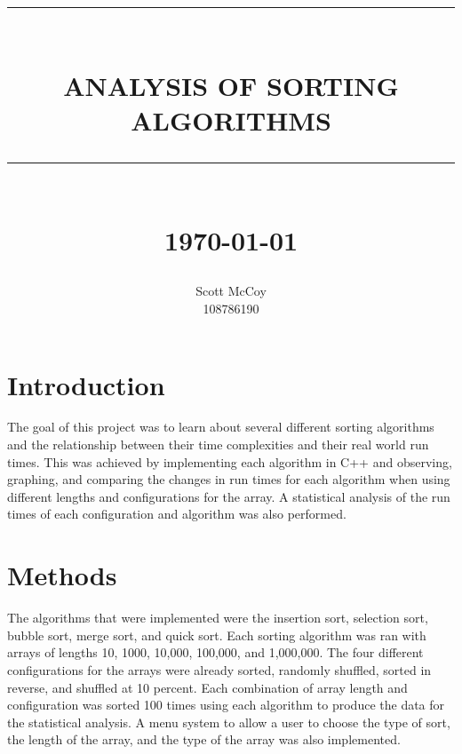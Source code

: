 \documentclass[12pt]{report}
\newcommand{\HRule}[1]{\rule{\linewidth}{#1}}
\begin{document}
\title{ \normalsize \textsc{}
        \\ [2.0cm]
        \HRule{0.5pt} \\
        \LARGE \textbf{\uppercase{Analysis of Sorting Algorithms}}
        \HRule{2pt} \\ [0.5cm]
        \normalsize \today \vspace*{5\baselineskip}}

\date{}

\author{
        Scott McCoy \\ 
        108786190 \\
       	}

\maketitle
\tableofcontents
\newpage

\sectionfont{\scshape}


\section*{Introduction}
	The goal of this project was to learn about several different
	sorting algorithms and the relationship between their time 
	complexities and their real world run times. This was achieved
	by implementing each algorithm in C++ and observing, graphing, 
	and comparing the changes in run times for each algorithm when 
	using different lengths and configurations for the array. A
	statistical analysis of the run times of each configuration
	and algorithm was also performed.

\section*{Methods}
	The algorithms that were implemented were the insertion sort,
	selection sort, bubble sort, merge sort, and quick sort. Each 
	sorting algorithm was ran with arrays of lengths 10, 1000, 10,000,
	100,000, and 1,000,000. The four different configurations for
	the arrays were already sorted, randomly shuffled, sorted in reverse,
	and shuffled at 10 percent. Each combination of array length and 
	configuration was sorted 100 times using each algorithm to produce the
	data for the statistical analysis. A menu system to allow a user to 
	choose the type of sort, the length of the array, and the type of the
	array was also implemented.
\end{document}
